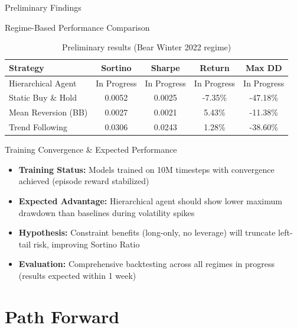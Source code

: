 \documentclass[aspectratio=169]{beamer}
\begin{document}
\begin{frame}{Preliminary Findings}
\begin{block}{Regime-Based Performance Comparison}
\begin{table}[h]
\centering
\small
\begin{tabular}{lcccc}
\toprule
\textbf{Strategy} & \textbf{Sortino} & \textbf{Sharpe} & \textbf{Return} & \textbf{Max DD} \\
\midrule
Hierarchical Agent & \alert{In Progress} & In Progress & In Progress & \alert{In Progress} \\
Static Buy \& Hold & 0.0052 & 0.0025 & -7.35\% & -47.18\% \\
Mean Reversion (BB) & 0.0027 & 0.0021 & 5.43\% & -11.38\% \\
Trend Following & 0.0306 & 0.0243 & 1.28\% & -38.60\% \\
\bottomrule
\end{tabular}
\caption{Preliminary results (Bear Winter 2022 regime)}
\end{table}
\end{block}

\vspace{0.3cm}

\begin{block}{Training Convergence \& Expected Performance}
\begin{itemize}
    \item \textbf{Training Status:} Models trained on 10M timesteps with convergence achieved (episode reward stabilized)
    \item \textbf{Expected Advantage:} Hierarchical agent should show \alert{lower maximum drawdown} than baselines during volatility spikes
    \item \textbf{Hypothesis:} Constraint benefits (long-only, no leverage) will truncate left-tail risk, improving Sortino Ratio
    \item \textbf{Evaluation:} Comprehensive backtesting across all regimes in progress (results expected within 1 week)
\end{itemize}
\end{block}
\end{frame}


\section{Path Forward}
\end{document}
